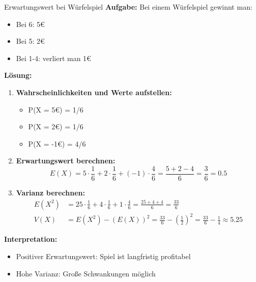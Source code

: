 \begin{example}{Erwartungswert bei Würfelspiel}
\textbf{Aufgabe:} Bei einem Würfelspiel gewinnt man:
\begin{itemize}
\item Bei 6: 5€
\item Bei 5: 2€
\item Bei 1-4: verliert man 1€
\end{itemize}

\textbf{Lösung:}
\begin{enumerate}
\item \textbf{Wahrscheinlichkeiten und Werte aufstellen:}
   \begin{itemize}
   \item P(X = 5€) = 1/6
   \item P(X = 2€) = 1/6
   \item P(X = -1€) = 4/6
   \end{itemize}

\item \textbf{Erwartungswert berechnen:}
   $$E(X) = 5 \cdot \frac{1}{6} + 2 \cdot \frac{1}{6} + (-1) \cdot \frac{4}{6} = \frac{5+2-4}{6} = \frac{3}{6} = 0.5$$

\item \textbf{Varianz berechnen:}
   \begin{align*}
   E(X^2) &= 25 \cdot \frac{1}{6} + 4 \cdot \frac{1}{6} + 1 \cdot \frac{4}{6} = \frac{25+4+4}{6} = \frac{33}{6} \\
   V(X) &= E(X^2) - (E(X))^2 = \frac{33}{6} - (\frac{1}{2})^2 = \frac{33}{6} - \frac{1}{4} \approx 5.25
   \end{align*}
\end{enumerate}

\textbf{Interpretation:}
\begin{itemize}
\item Positiver Erwartungswert: Spiel ist langfristig profitabel
\item Hohe Varianz: Große Schwankungen möglich
\end{itemize}
\end{example}

